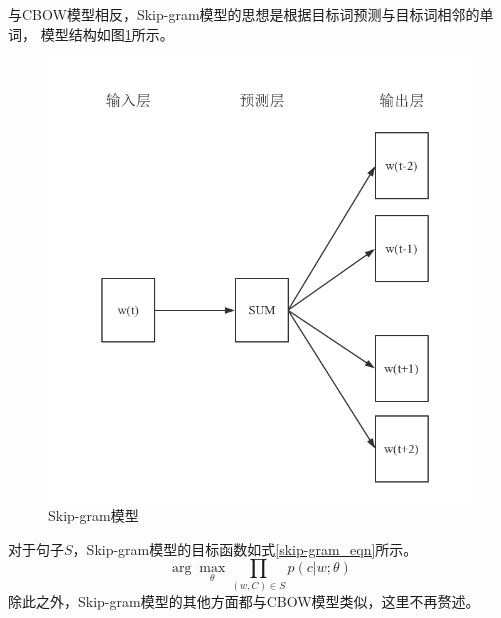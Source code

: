 \documentclass{standalone}
\begin{document}
与CBOW模型相反，Skip-gram模型的思想是根据目标词预测与目标词相邻的单词，
模型结构如图\ref{skip-gram}所示。
\begin{figure}[h]
    \includegraphics[scale=0.6]{picture/skip-gram.png}
    \caption{Skip-gram模型}
    \label{skip-gram}
\end{figure}
对于句子$S$，Skip-gram模型的目标函数如式\ref{skip-gram_eqn}所示。
\begin{equation}
    \arg \max_{\theta } \prod_{\left ( w,C \right )\in S}p\left ( c|w;\theta \right )
    \label{skip-gram_eqn}
\end{equation}
除此之外，Skip-gram模型的其他方面都与CBOW模型类似，这里不再赘述。
\end{document}
